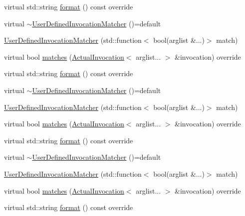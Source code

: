 \begin{DoxyCompactItemize}
\item 
virtual std\+::string \mbox{\hyperlink{structfakeit_1_1UserDefinedInvocationMatcher_a8090f8ab0af9c775f833e725f4414368}{format}} () const override
\item 
virtual \mbox{\hyperlink{structfakeit_1_1UserDefinedInvocationMatcher_a4bf5571d7a4cac54d1cad8aad72ae638}{$\sim$\+User\+Defined\+Invocation\+Matcher}} ()=default
\item 
\mbox{\hyperlink{structfakeit_1_1UserDefinedInvocationMatcher_a99e448ddbbf9e200f34e80b745ec4ad0}{User\+Defined\+Invocation\+Matcher}} (std\+::function$<$ bool(arglist \&...)$>$ match)
\item 
virtual bool \mbox{\hyperlink{structfakeit_1_1UserDefinedInvocationMatcher_a52f5b5e7de4484b7e9fecb166f6b80e2}{matches}} (\mbox{\hyperlink{structfakeit_1_1ActualInvocation}{Actual\+Invocation}}$<$ arglist... $>$ \&invocation) override
\item 
virtual std\+::string \mbox{\hyperlink{structfakeit_1_1UserDefinedInvocationMatcher_a8090f8ab0af9c775f833e725f4414368}{format}} () const override
\item 
virtual \mbox{\hyperlink{structfakeit_1_1UserDefinedInvocationMatcher_a4bf5571d7a4cac54d1cad8aad72ae638}{$\sim$\+User\+Defined\+Invocation\+Matcher}} ()=default
\item 
\mbox{\hyperlink{structfakeit_1_1UserDefinedInvocationMatcher_a99e448ddbbf9e200f34e80b745ec4ad0}{User\+Defined\+Invocation\+Matcher}} (std\+::function$<$ bool(arglist \&...)$>$ match)
\item 
virtual bool \mbox{\hyperlink{structfakeit_1_1UserDefinedInvocationMatcher_a52f5b5e7de4484b7e9fecb166f6b80e2}{matches}} (\mbox{\hyperlink{structfakeit_1_1ActualInvocation}{Actual\+Invocation}}$<$ arglist... $>$ \&invocation) override
\item 
virtual std\+::string \mbox{\hyperlink{structfakeit_1_1UserDefinedInvocationMatcher_a8090f8ab0af9c775f833e725f4414368}{format}} () const override
\item 
virtual \mbox{\hyperlink{structfakeit_1_1UserDefinedInvocationMatcher_a4bf5571d7a4cac54d1cad8aad72ae638}{$\sim$\+User\+Defined\+Invocation\+Matcher}} ()=default
\item 
\mbox{\hyperlink{structfakeit_1_1UserDefinedInvocationMatcher_a99e448ddbbf9e200f34e80b745ec4ad0}{User\+Defined\+Invocation\+Matcher}} (std\+::function$<$ bool(arglist \&...)$>$ match)
\item 
virtual bool \mbox{\hyperlink{structfakeit_1_1UserDefinedInvocationMatcher_a52f5b5e7de4484b7e9fecb166f6b80e2}{matches}} (\mbox{\hyperlink{structfakeit_1_1ActualInvocation}{Actual\+Invocation}}$<$ arglist... $>$ \&invocation) override
\item 
virtual std\+::string \mbox{\hyperlink{structfakeit_1_1UserDefinedInvocationMatcher_a8090f8ab0af9c775f833e725f4414368}{format}} () const override
\end{DoxyCompactItemize}


